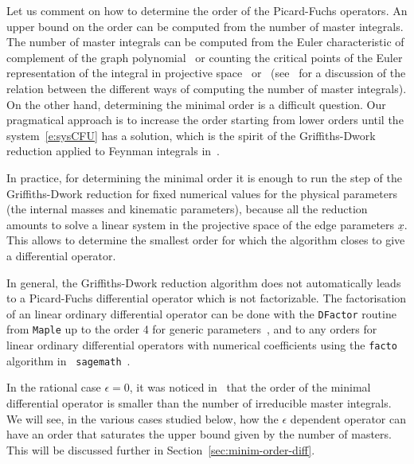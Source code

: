 \documentclass[a4paper,12pt]{article}
\numberwithin{equation}{section}
\numberwithin{figure}{section}
\begin{document}
\medskip
 
 Let us comment on how to determine the order of the Picard-Fuchs operators. An upper bound on the order can be computed
 from the number of master integrals.
 The number of master
integrals  can be computed from the Euler
characteristic of complement of the graph polynomial~\cite{Bitoun:2017nre} or counting the
critical points of the Euler representation of the integral in
projective
space~\cite{Lee:2013hzt,Cacciatori:2021nli}
or~\cite{Mastrolia:2018uzb,Frellesvig:2019uqt} (see~\cite{Agostini:2022cgv} for
a discussion of the relation between the different ways of computing the number of master
integrals). On the other hand, determining the minimal order is a
difficult question. Our pragmatical approach is to increase the order
starting from 
lower orders until the system~\eqref{e:sysCFU} has a solution, which is
the spirit of the Griffiths-Dwork reduction applied to Feynman
integrals in~\cite{Muller-Stach:2011qkg}.

In practice, for determining the minimal order it is enough to run the step of the
Griffiths-Dwork reduction for fixed numerical values for the physical
parameters (the internal masses and kinematic
parameters), because all the reduction amounts to solve a linear system in the projective space of
the edge parameters $\underline x$. This allows to determine the smallest order for which the
algorithm closes to give a differential operator.

In general, the Griffiths-Dwork reduction algorithm does not automatically
leads to a Picard-Fuchs differential operator  which is not factorizable. 
The factorisation of an linear ordinary
differential operator can be done with the {\tt DFactor} routine from
{\tt Maple} up to the order 4 for generic parameters~\cite{PutSinger,vanHoeij}, and to any
orders for linear  ordinary
differential operators with numerical coefficients
using the {\tt facto} algorithm in {\tt
	sagemath}~\cite{chyzak2022symbolic,goyer2021sage}.


 In the rational case $\epsilon=0$, it was noticed
in~\cite{Bloch:2013tra,Bloch:2016izu,Bloch:2014qca,Lairez:2022zkj} that the order of the minimal differential operator is
smaller than the number of irreducible master integrals. We will see,
in the various cases studied below, 
how the $\epsilon$ dependent operator can have an order that saturates
the upper bound given by the number of masters.  This will
      be discussed further in Section~\ref{sec:minim-order-diff}.


\end{document}
